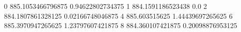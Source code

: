 0 885.1053466796875 0.94622802734375
1 884.1591186523438 0.0
2 884.1807861328125 0.02166748046875
4 885.603515625 1.44439697265625
6 885.3970947265625 1.23797607421875
8 884.360107421875 0.20098876953125
